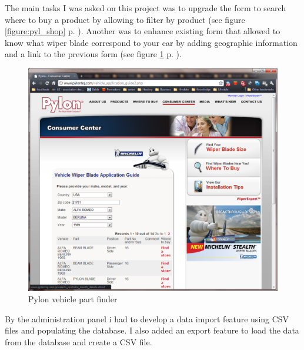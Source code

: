The main tasks I was asked on this project was to upgrade the form to search where to buy a product by allowing to filter by product (see figure \ref{figure:pyl_shop} p. \pageref{figure:pyl_shop}). Another was to enhance existing form that allowed to know what wiper blade correspond to your car by adding geographic information and a link to the previous form (see figure \ref{figure:pyl_vehicle} p. \pageref{figure:pyl_vehicle}).

\begin{figure}[!h]
\centering
\includegraphics[width=.55\textwidth]{img/pylon_vehicule.png}
\caption{Pylon vehicle part finder}
\label{figure:pyl_vehicle}
\end{figure}

By the administration panel i had to develop a data import feature using CSV files and populating the database. I also added an export feature to load the data from the database and create a CSV file.
